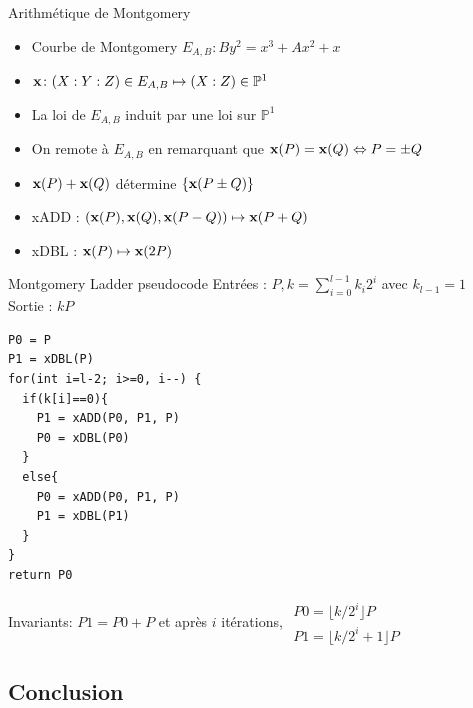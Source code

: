 \documentclass{beamer}
\begin{document}
\begin{frame}{Arithmétique de Montgomery}
	\begin{itemize}
		\item{ Courbe de Montgomery $E_{A,B} : By^2 = x^3+Ax^2 + x$}
		\item{ $\textbf{x}\colon (X:Y:Z) \in E_{A,B} \mapsto (X:Z) \in \mathbb{P}^1$}
		\item{La loi de $E_{A,B}$ induit par {\x} une loi sur $\mathbb{P}^1$}
		\item{On remote à $E_{A,B}$ en remarquant que $\textbf{x}(P)=\textbf{x}(Q)\Leftrightarrow P=\pm Q$}
		\item{ $\textbf{x}(P)+\textbf{x}(Q)$ détermine $\lbrace\textbf{x}(P \pm Q)\rbrace$}
		\item{xADD : $(\textbf{x}(P),\textbf{x}(Q), \textbf{x}(P-Q)) \mapsto \textbf{x}(P+Q)$}
		\item{xDBL : $\textbf{x}(P) \mapsto \textbf{x}(2P)$}
	\end{itemize}
\end{frame}

\begin{frame}[fragile]{Montgomery Ladder pseudocode}
	\small	Entrées : $P, k = \sum_{i=0}^{l-1}k_i 2^i$ avec $k_{l-1}=1$\\
	Sortie : $kP$ 
\begin{verbatim}
P0 = P
P1 = xDBL(P)
for(int i=l-2; i>=0, i--) {
  if(k[i]==0){
    P1 = xADD(P0, P1, P)
    P0 = xDBL(P0)
  }
  else{
    P0 = xADD(P0, P1, P)
    P1 = xDBL(P1)
  }
}
return P0
\end{verbatim}
Invariants: $P1 = P0+P$ et après $i$ itérations, 
$\begin{array}{l}P0 = \lfloor k/2^i\rfloor P \\ P1 = \lfloor k/2^i + 1\rfloor P\end{array}$
\end{frame}

\subsection{Conclusion}
\begin{frame}
\end{frame}
\end{document}
